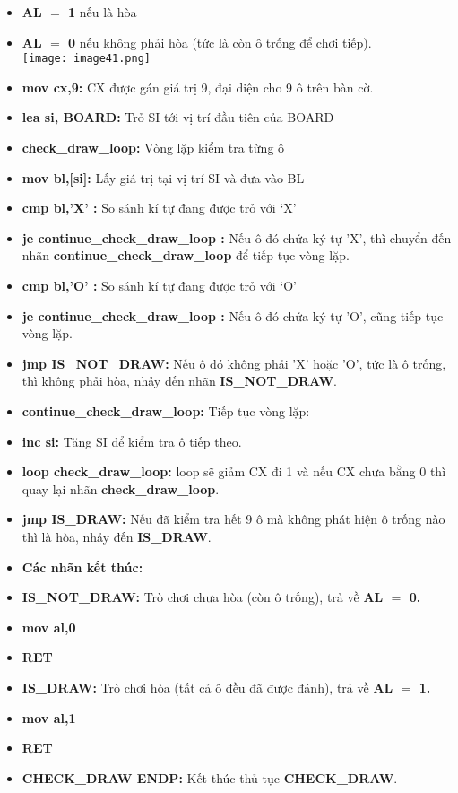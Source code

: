 \begin{itemize}
    \item \textbf{AL $=$ 1} nếu là hòa
    \item \textbf{AL $=$ 0} nếu không phải hòa (tức là còn ô trống để chơi tiếp).\\
    \texttt{[image: image41.png]}
    \item \textbf{mov cx,9:} CX được gán giá trị 9, đại diện cho 9 ô trên bàn cờ.
    \item \textbf{lea si, BOARD:} Trỏ SI tới vị trí đầu tiên của BOARD
    \item \textbf{check\_draw\_loop:} Vòng lặp kiểm tra từng ô
    \item \textbf{mov bl,[si]:} Lấy giá trị tại vị trí SI và đưa vào BL
    \item \textbf{cmp bl,'X' :} So sánh kí tự đang được trỏ với ‘X’
    \item \textbf{je  continue\_check\_draw\_loop :} Nếu ô đó chứa ký tự 'X', thì chuyển đến nhãn \textbf{continue\_check\_draw\_loop} để tiếp tục vòng lặp.
    \item \textbf{cmp bl,'O' : }So sánh kí tự đang được trỏ với ‘O’
    \item \textbf{je  continue\_check\_draw\_loop :} Nếu ô đó chứa ký tự 'O', cũng tiếp tục vòng lặp.
    \item \textbf{jmp IS\_NOT\_DRAW: }Nếu ô đó không phải 'X' hoặc 'O', tức là ô trống, thì không phải hòa, nhảy đến nhãn \textbf{IS\_NOT\_DRAW}.
    \item \textbf{continue\_check\_draw\_loop:} Tiếp tục vòng lặp:
    \item \textbf{inc si:} Tăng SI để kiểm tra ô tiếp theo.
    \item \textbf{loop check\_draw\_loop: }loop sẽ giảm CX đi 1 và nếu CX chưa bằng 0 thì quay lại nhãn \textbf{check\_draw\_loop}.
    \item \textbf{jmp IS\_DRAW:} Nếu đã kiểm tra hết 9 ô mà không phát hiện ô trống nào thì là hòa, nhảy đến \textbf{IS\_DRAW}.
    \item \textbf{Các nhãn kết thúc:}
    \item \textbf{IS\_NOT\_DRAW:} Trò chơi chưa hòa (còn ô trống), trả về \textbf{AL $=$ 0.}
    \item \textbf{mov al,0 }
    \item \textbf{RET}
    \item \textbf{IS\_DRAW:} Trò chơi hòa (tất cả ô đều đã được đánh), trả về \textbf{AL $=$ 1.}
    \item \textbf{mov al,1}
    \item \textbf{RET}
    \item \textbf{CHECK\_DRAW ENDP:} Kết thúc thủ tục \textbf{CHECK\_DRAW}.   
\end{itemize}

